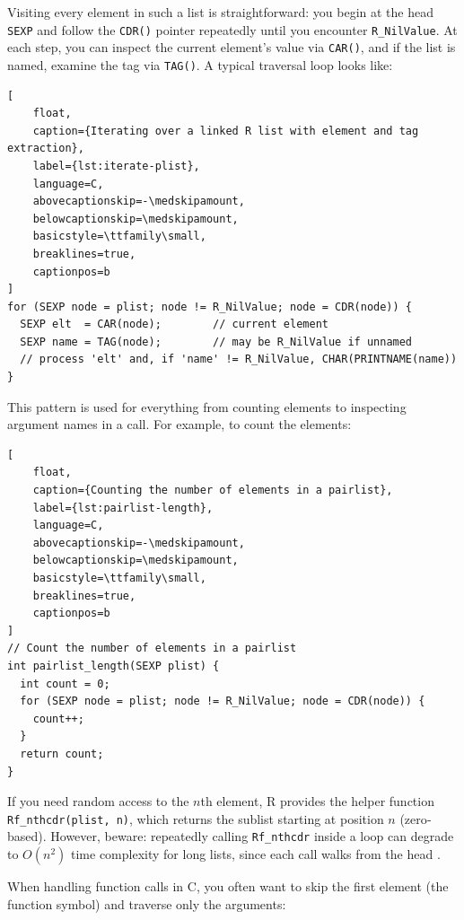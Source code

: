 Visiting every element in such a list is straightforward: you begin at the head \texttt{SEXP} and follow the \texttt{CDR()} pointer repeatedly until you encounter \texttt{R\_NilValue}.  At each step, you can inspect the current element’s value via \texttt{CAR()}, and if the list is named, examine the tag via \texttt{TAG()}.  A typical traversal loop looks like:

\begin{lstlisting}[
    float,
    caption={Iterating over a linked R list with element and tag extraction},
    label={lst:iterate-plist},
    language=C,
    abovecaptionskip=-\medskipamount,
    belowcaptionskip=\medskipamount,
    basicstyle=\ttfamily\small,
    breaklines=true,
    captionpos=b
]
for (SEXP node = plist; node != R_NilValue; node = CDR(node)) {
  SEXP elt  = CAR(node);        // current element
  SEXP name = TAG(node);        // may be R_NilValue if unnamed
  // process 'elt' and, if 'name' != R_NilValue, CHAR(PRINTNAME(name))
}
\end{lstlisting}


This pattern is used for everything from counting elements to inspecting argument names in a call.  For example, to count the elements:

\begin{lstlisting}[
    float,
    caption={Counting the number of elements in a pairlist},
    label={lst:pairlist-length},
    language=C,
    abovecaptionskip=-\medskipamount,
    belowcaptionskip=\medskipamount,
    basicstyle=\ttfamily\small,
    breaklines=true,
    captionpos=b
]
// Count the number of elements in a pairlist
int pairlist_length(SEXP plist) {
  int count = 0;
  for (SEXP node = plist; node != R_NilValue; node = CDR(node)) {
    count++;
  }
  return count;
}
\end{lstlisting}


If you need random access to the \(n\)th element, R provides the helper function \texttt{Rf\_nthcdr(plist, n)}, which returns the sublist starting at position \(n\) (zero‐based).  However, beware: repeatedly calling \texttt{Rf\_nthcdr} inside a loop can degrade to \(O(n^2)\) time complexity for long lists, since each call walks from the head \cite{wickham_pairlists}.  

When handling function calls in C, you often want to skip the first element (the function symbol) and traverse only the arguments:

